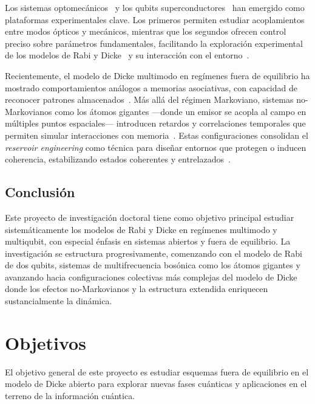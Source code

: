 \documentclass[onecolumn,notitlepage,letterpaper,aps,pra,12pt]{article}
\numberwithin{equation}{section}
\begin{document}
Los sistemas optomecánicos~\cite{debnath2015} y los qubits superconductores~\cite{Lamata2017} han emergido como plataformas experimentales clave. Los primeros permiten estudiar acoplamientos entre modos ópticos y mecánicos, mientras que los segundos ofrecen control preciso sobre parámetros fundamentales, facilitando la exploración experimental de los modelos de Rabi y Dicke~\cite{Mezzacapo14} y su interacción con el entorno~\cite{hwang2018,Lo2021}.

Recientemente, el modelo de Dicke multimodo en regímenes fuera de equilibrio ha mostrado comportamientos análogos a memorias asociativas, con capacidad de reconocer patrones almacenados~\cite{fiorelli2020}. Más allá del régimen Markoviano, sistemas no-Markovianos como los átomos gigantes —donde un emisor se acopla al campo en múltiples puntos espaciales— introducen retardos y correlaciones temporales que permiten simular interacciones con memoria~\cite{kockum2019,guo2020}. Estas configuraciones consolidan el \textit{reservoir engineering} como técnica para diseñar entornos que protegen o inducen coherencia, estabilizando estados coherentes y entrelazados~\cite{poyatos1996,Diehl2008}.


\subsection{Conclusión}

Este proyecto de investigación doctoral tiene como objetivo principal estudiar sistemáticamente los modelos de Rabi y Dicke en regímenes multimodo y multiqubit, con especial énfasis en sistemas abiertos y fuera de equilibrio. La investigación se estructura progresivamente, comenzando con el modelo de Rabi de dos qubits, sistemas de multifrecuencia bosónica como los átomos gigantes y  avanzando hacia configuraciones colectivas más complejas del modelo de Dicke  donde los efectos no-Markovianos y la estructura  extendida enriquecen sustancialmente la dinámica.


\section{Objetivos}

El objetivo general de este proyecto es estudiar esquemas fuera de equilibrio en el modelo de Dicke abierto para explorar nuevas fases cuánticas y aplicaciones en el terreno de la información cuántica. 
\end{document}
